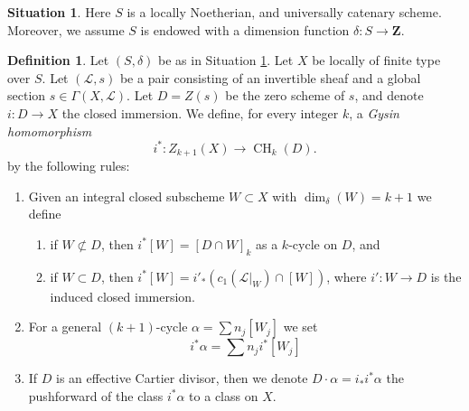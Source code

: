 \documentclass{amsart}
\theoremstyle{plain}
\theoremstyle{definition}
\newtheorem{definition}[subsection]{Definition}
\newtheorem{situation}[subsection]{Situation}
\theoremstyle{remark}
\numberwithin{equation}{subsection}
\def\CH{\mathop{\mathrm{CH}}\nolimits}
\begin{document}
\begin{situation}
\label{situation-setup}
Here $S$ is a locally Noetherian, and universally catenary scheme.
Moreover, we assume $S$ is endowed with a dimension function
$\delta : S \longrightarrow \mathbf{Z}$.
\end{situation}

\begin{definition}
\label{definition-gysin-homomorphism}
Let $(S, \delta)$ be as in Situation \ref{situation-setup}.
Let $X$ be locally of finite type over $S$.
Let $(\mathcal{L}, s)$ be a pair consisting of an invertible
sheaf and a global section $s \in \Gamma(X, \mathcal{L})$.
Let $D = Z(s)$ be the zero scheme of $s$, and
denote $i : D \to X$ the closed immersion.
We define, for every integer $k$, a {\it Gysin homomorphism}
$$
i^* : Z_{k + 1}(X) \to \CH_k(D).
$$
by the following rules:
\begin{enumerate}
\item Given an integral closed subscheme $W \subset X$ with
$\dim_\delta(W) = k + 1$ we define
\begin{enumerate}
\item if $W \not \subset D$, then $i^*[W] = [D \cap W]_k$ as a
$k$-cycle on $D$, and
\item if $W \subset D$, then
$i^*[W] = i'_*(c_1(\mathcal{L}|_W) \cap [W])$,
where $i' : W \to D$ is the induced closed immersion.
\end{enumerate}
\item For a general $(k + 1)$-cycle $\alpha = \sum n_j[W_j]$
we set
$$
i^*\alpha = \sum n_j i^*[W_j]
$$
\item If $D$ is an effective Cartier divisor, then we denote
$D \cdot \alpha = i_*i^*\alpha$ the pushforward of the class $i^*\alpha$
to a class on $X$.
\end{enumerate}
\end{definition}
\end{document}
